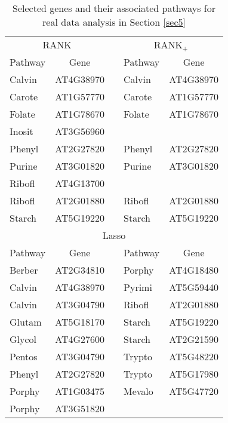 \documentclass[11pt]{article}
\begin{document}
\begin{table}[tp!]
	\centering
	\caption{\label{tab5-real} Selected genes and their associated pathways for real data analysis in Section \ref{sec5}}
	\vskip0.2cm
	\tabcolsep 0.6cm
	\begin{tabular}{lcclc}
		\toprule
		\multicolumn{2}{c}{RANK}&&\multicolumn{2}{c}{RANK$_+$}      \\
		\cline{1-2}\cline{4-5}
		Pathway &Gene && Pathway &Gene    \\
		\hline
		Calvin   & AT4G38970  &   &   Calvin   & AT4G38970  \\
		Carote  & AT1G57770 &   &   Carote   & AT1G57770  \\
		Folate   & AT1G78670 &   &   Folate   & AT1G78670  \\
		Inosit     & AT3G56960 &   &      &  \\
		Phenyl   & AT2G27820 &   &   Phenyl   & AT2G27820  \\
		Purine    & AT3G01820 &   &   Purine    & AT3G01820  \\
		Ribofl     & AT4G13700 &   &   &  \\
		Ribofl     & AT2G01880 &   &   Ribofl     & AT2G01880  \\
		Starch    & AT5G19220  &   &   Starch    & AT5G19220  \\
		\hline
		\multicolumn{5}{c}{Lasso}\\
		\hline
		Pathway &Gene && Pathway &Gene \\
		\cline{1-2}\cline{4-5}
		Berber & AT2G34810  &  & Porphy  & AT4G18480   \\
		Calvin  & AT4G38970  &  &  Pyrimi  &  AT5G59440  \\
		Calvin  & AT3G04790  &  &  Ribofl   &  AT2G01880  \\
		Glutam & AT5G18170  &  &  Starch &  AT5G19220   \\
		Glycol   & AT4G27600  &  &  Starch &   AT2G21590 \\
		Pentos  & AT3G04790  &  &  Trypto &   AT5G48220 \\
		Phenyl   & AT2G27820  &  & Trypto  &   AT5G17980 \\
		Porphy  & AT1G03475  &  &  Mevalo &   AT5G47720 \\
		Porphy  & AT3G51820  &  &   &    \\
		\bottomrule
	\end{tabular}
\end{table}
\end{document}

